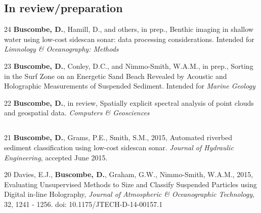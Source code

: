 \documentclass[margin,line]{resume}
\begin{document}
\begin{resume}
    \begin{footnotesize}
    


	\subsection{\mysidestyle In review/preparation}
	\begin{list1}

	\item[24] {\bf Buscombe, D.}, Hamill, D., and others, in prep., Benthic imaging in shallow water using low-cost sidescan sonar: data processing considerations. Intended for {\sl Limnology \& Oceanography: Methods}\\
	
	\item[23] {\bf 	Buscombe, D.}, Conley, D.C., and Nimmo-Smith, W.A.M., in prep., Sorting in the Surf Zone on an Energetic Sand Beach Revealed by Acoustic and Holographic Measurements of Suspended Sediment. Intended for {\sl Marine Geology}\\
	
	\item[22] {\bf 	Buscombe, D.}, in review, Spatially explicit spectral analysis of point clouds and geospatial data. {\sl Computers \& Geosciences}

	\end{list1}
	
	\subsection{}
	\begin{list1}
	
	\item[21] {\bf Buscombe, D.}, Grams, P.E., Smith, S.M., 2015, Automated riverbed sediment classification using low-cost sidescan sonar. {\sl Journal of Hydraulic Engineering}, accepted June 2015.\\
	
	\item[20] Davies, E.J., {\bf Buscombe, D.}, Graham, G.W., Nimmo-Smith, W.A.M., 2015, Evaluating Unsupervised Methods to Size and Classify Suspended Particles using Digital in-line Holography, {\sl Journal of Atmospheric \& Oceanographic Technology}, 32, 1241 - 1256. doi: 10.1175/JTECH-D-14-00157.1 
	

\end{list1}
\end{footnotesize}
\end{resume}
\end{document}
